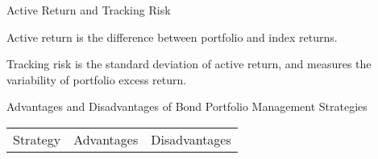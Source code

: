 \documentclass[../custom,grid]{flashcards}
\begin{document}

\begin{flashcard}{Active Return and Tracking Risk}
    \begin{flushleft}
        Active return is the difference between portfolio and index returns.\newline

        Tracking risk is the standard deviation of active return, and measures the variability of portfolio excess return.
    \end{flushleft}
\end{flashcard}

\begin{flashcard}{Advantages and Disadvantages of Bond Portfolio Management Strategies}
    \begin{tabular}{l l l} %
        Strategy & Advantages & Disadvantages \\ %
    \end{tabular}
\end{flashcard}
\end{document}
